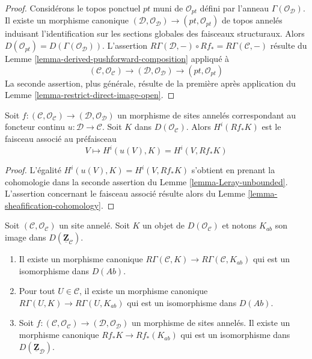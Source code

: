 \begin{proof}
Considérons le topos ponctuel $pt$ muni de $\mathcal{O}_{pt}$ défini par
l'anneau $\Gamma(\mathcal{O}_\mathcal{D})$. Il existe un morphisme canonique
$(\mathcal{D}, \mathcal{O}_\mathcal{D}) \to (pt, \mathcal{O}_{pt})$
de topos annelés induisant l'identification sur les sections globales des
faisceaux structuraux. Alors
$D(\mathcal{O}_{pt}) = D(\Gamma(\mathcal{O}_\mathcal{D}))$.
L'assertion
$R\Gamma(\mathcal{D}, -) \circ Rf_* = R\Gamma(\mathcal{C}, -)$
résulte du Lemme \ref{lemma-derived-pushforward-composition} appliqué à
$$
(\mathcal{C}, \mathcal{O}_\mathcal{C}) \to
(\mathcal{D}, \mathcal{O}_\mathcal{D}) \to (pt, \mathcal{O}_{pt})
$$
La seconde assertion, plus générale, résulte de la première après
application du Lemme \ref{lemma-restrict-direct-image-open}.
\end{proof}

\begin{lemma}
\label{lemma-unbounded-describe-higher-direct-images}
Soit $f : (\mathcal{C}, \mathcal{O}_\mathcal{C}) \to
(\mathcal{D}, \mathcal{O}_\mathcal{D})$ un morphisme de sites annelés
correspondant au foncteur continu $u : \mathcal{D} \to \mathcal{C}$.
Soit $K$ dans $D(\mathcal{O}_\mathcal{C})$. Alors $H^i(Rf_*K)$ est le
faisceau associé au préfaisceau
$$
V \mapsto H^i(u(V), K) = H^i(V, Rf_*K)
$$
\end{lemma}

\begin{proof}
L'égalité $H^i(u(V), K) = H^i(V, Rf_*K)$ s'obtient en prenant la
cohomologie dans la seconde assertion du Lemme
\ref{lemma-Leray-unbounded}. L'assertion concernant le faisceau associé
résulte alors du Lemme \ref{lemma-sheafification-cohomology}.
\end{proof}

\begin{lemma}
\label{lemma-modules-abelian-unbounded}
Soit $(\mathcal{C}, \mathcal{O}_\mathcal{C})$ un site annelé. Soit $K$ un
objet de $D(\mathcal{O}_\mathcal{C})$ et notons $K_{ab}$ son image dans
$D(\underline{\mathbf{Z}}_\mathcal{C})$.
\begin{enumerate}
\item Il existe un morphisme canonique
$R\Gamma(\mathcal{C}, K) \to R\Gamma(\mathcal{C}, K_{ab})$
qui est un isomorphisme dans $D(\textit{Ab})$.
\item Pour tout $U \in \mathcal{C}$, il existe un morphisme canonique
$R\Gamma(U, K) \to R\Gamma(U, K_{ab})$
qui est un isomorphisme dans $D(\textit{Ab})$.
\item Soit $f : (\mathcal{C}, \mathcal{O}_\mathcal{C}) \to
(\mathcal{D}, \mathcal{O}_\mathcal{D})$ un morphisme de sites annelés.
Il existe un morphisme canonique $Rf_*K \to Rf_*(K_{ab})$ qui est un
isomorphisme dans $D(\underline{\mathbf{Z}}_\mathcal{D})$.
\end{enumerate}
\end{lemma}

